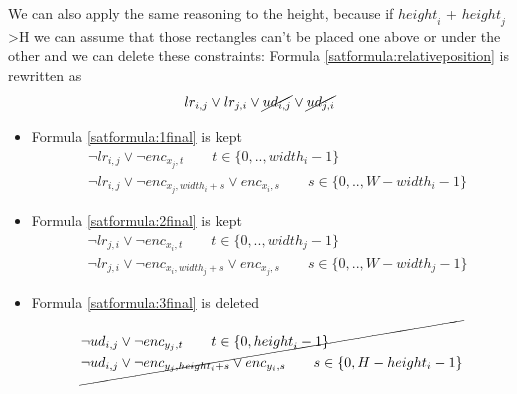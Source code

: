     We can also apply the same reasoning to the height, because if ${height}_i$ + ${height}_j$>H we can assume that those rectangles can't be placed one above or under the other and we can delete these constraints:
    \newline
    Formula \ref{satformula:relativeposition} is rewritten as
    \begin{equation*}
        lr_{i,j} \vee lr_{j,i} \vee \cancel{ud_{i,j}} \vee \cancel{ud_{j,i}}
    \end{equation*}
    \begin{itemize}
        \item Formula \ref{satformula:1final} is kept
            \begin{equation*}
            \begin{aligned}
                &\neg lr_{i,j} \vee \neg {enc}_{x_{j},t} \qquad t \in \{ 0,.., {width}_i -1\}
                \\
                &\neg lr_{i,j} \vee \neg {enc}_{x_{j},{width}_i+s} \vee {enc}_{x_{i},s} \qquad s \in \{ 0,.., W-{width}_i-1\}
            \end{aligned}
            \end{equation*}
        \item Formula \ref{satformula:2final} is kept
            \begin{equation*}
            \begin{aligned}
                &\neg lr_{j,i} \vee \neg {enc}_{x_{i},t} \qquad t \in \{ 0,.., {width}_j -1\} \\
                &\neg lr_{j,i} \vee \neg {enc}_{x_{i},{width}_j+s} \vee {enc}_{x_{j},s} \qquad s \in \{ 0,.., W-{width}_j-1\}
            \end{aligned}
            \end{equation*}
    
        \item Formula \ref{satformula:3final} is deleted
            \begin{equation*}
            \cancel{
            \begin{aligned}
                &\neg ud_{i,j} \vee \neg{enc}_{y_{j},t} \qquad t \in \{ 0, {height}_i -1\}
                \\
                &\neg ud_{i,j} \vee \neg {enc}_{y_{j},height_{i}+s} \vee enc_{y_{i},s} \qquad s \in \{ 0, H-height_i-1\}
            \end{aligned}
            }
            \end{equation*}
    

\end{itemize}

